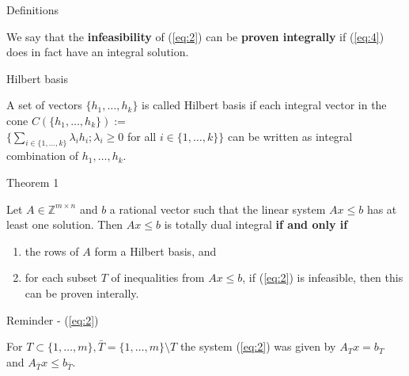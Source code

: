 \documentclass{beamer}
\begin{document}
\begin{frame}{Definitions}

	\begin{block}

		We say that the \textbf{infeasibility} of (\ref{eq:2}) can be \textbf{proven integrally} if (\ref{eq:4}) does in fact have an integral solution. 

	\end{block}

	\begin{block}{Hilbert basis}

		A set of vectors $\{h_1, \dots, h_k\}$ is called Hilbert basis if each integral vector in the cone $C(\{h_1, \dots, h_k\}) :=$\\ $\{\sum_{i\in \{ 1,\dots,k \}} \lambda_i h_i; \lambda_i \geq 0$ for all $i \in \{1,\dots,k\} \}$ can be written as integral combination of $h_1, \dots, h_k$.

	\end{block}

\end{frame}



\begin{frame}

	\begin{block}{Theorem 1}

		Let $A\in \mathbb{Z}^{m \times n}$ and $b$ a rational vector such that the linear system $Ax \leq b$ has at least one solution. Then $Ax \leq b$ is totally dual integral \textbf{if and only if}\\

		\begin{enumerate}[i]

			\item the rows of $A$ form a Hilbert basis, and

			\item for each subset $T$ of inequalities from $Ax\leq b$, if (\ref{eq:2}) is infeasible, then this can be proven interally.

		\end{enumerate}

	\end{block}

	\begin{block}{Reminder - (\ref{eq:2})}

		For $T\subset \{ 1, \dots, m\}, \bar{T} = \{1, \dots, m \} \setminus T$ the system (\ref{eq:2}) was given by $A_T x= b_T$ and $A_{\bar{T}}x\leq b_{\bar{T}}$.

	\end{block}

\end{frame}
\end{document}
